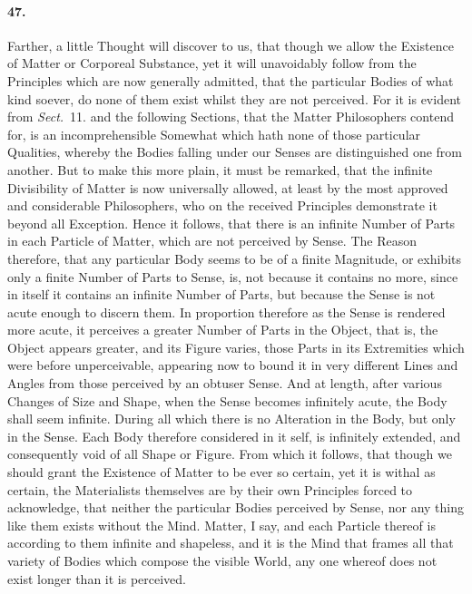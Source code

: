 \documentclass[]{article}
\newenvironment{sectionbody}{}{}
\begin{document}
\begin{sectionbody}
\paragraph{47.} Farther, a little Thought will discover to us, that though we
allow the Existence of Matter or Corporeal Substance, yet it will
unavoidably follow from the Principles which are now generally
admitted, that the particular Bodies of what kind soever, do none
of them exist whilst they are not perceived.  For it is evident
from \emph{Sect.}~11.  and the following Sections, that the
Matter Philosophers contend for, is an incomprehensible Somewhat
which hath none of those particular Qualities, whereby the Bodies
falling under our Senses are distinguished one from another.  But
to make this more plain, it must be remarked, that the infinite
Divisibility of Matter is now universally allowed, at least by
the most approved and considerable Philosophers, who on the
received Principles demonstrate it beyond all Exception.  Hence
it follows, that there is an infinite Number of Parts in each
Particle of Matter, which are not perceived by Sense.  The Reason
therefore, that any particular Body seems to be of a finite
Magnitude, or exhibits only a finite Number of Parts to Sense,
is, not because it contains no more, since in itself it contains
an infinite Number of Parts, but because the Sense is not acute
enough to discern them.  In proportion therefore as the Sense is
rendered more acute, it perceives a greater Number of Parts in
the Object, that is, the Object appears greater, and its Figure
varies, those Parts in its Extremities which were before
unperceivable, appearing now to bound it in very different Lines
and Angles from those perceived by an obtuser Sense.  And at
length, after various Changes of Size and Shape, when the Sense
becomes infinitely acute, the Body shall seem infinite.  During
all which there is no Alteration in the Body, but only in the
Sense.  Each Body therefore considered in it self, is infinitely
extended, and consequently void of all Shape or Figure.  From
which it follows, that though we should grant the Existence of
Matter to be ever so certain, yet it is withal as certain, the
Materialists themselves are by their own Principles forced to
acknowledge, that neither the particular Bodies perceived by
Sense, nor any thing like them exists without the Mind.  Matter,
I say, and each Particle thereof is according to them infinite
and shapeless, and it is the Mind that frames all that variety of
Bodies which compose the visible World, any one whereof does not
exist longer than it is perceived.




\end{sectionbody}
\end{document}
